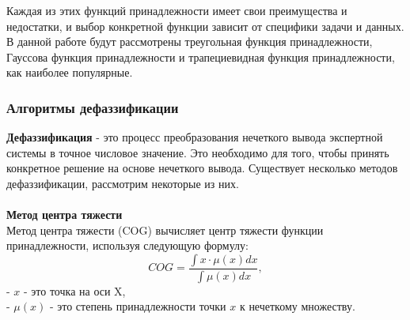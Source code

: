 \documentclass{article}
\begin{document}
    Каждая из этих функций принадлежности имеет свои преимущества и недостатки, и выбор конкретной функции зависит от специфики задачи и данных. В данной работе будут рассмотрены треугольная функция принадлежности, Гауссова функция принадлежности и трапециевидная функция принадлежности, как наиболее популярные.
    \subsubsection{Алгоритмы дефаззификации}
    \textbf{Дефаззификация} - это процесс преобразования нечеткого вывода экспертной системы в точное числовое значение. Это необходимо для того, чтобы принять конкретное решение на основе нечеткого вывода. Существует несколько методов дефаззификации, рассмотрим некоторые из них.\\
    ~\\
    \textbf{Метод центра тяжести}\\
    Метод центра тяжести (COG) вычисляет центр тяжести функции принадлежности, используя следующую формулу:\\

    \[
        COG = \frac{\int x \cdot \mu(x) dx}{\int \mu(x) dx},
    \]
    - \(x\) - это точка на оси X,\\
    - \(\mu(x)\) - это степень принадлежности точки \(x\) к нечеткому множеству.\\
\end{document}
